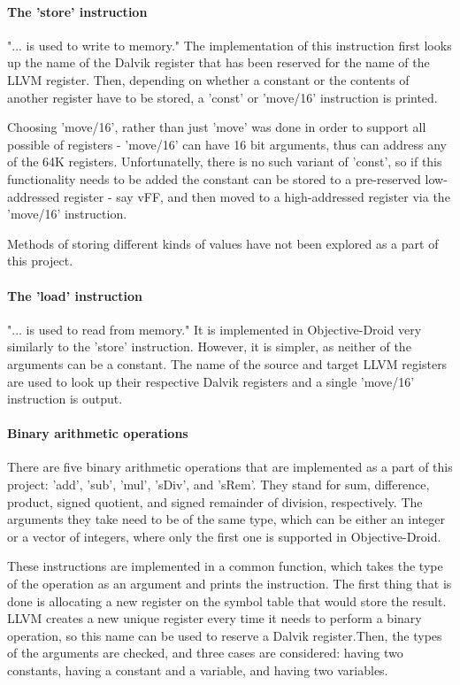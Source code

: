 \documentclass[parskip]{cs4rep}
\begin{document}
\paragraph{The 'store' instruction} "... is used to write to memory."\cite{P11} The implementation of this instruction first looks up the name of the Dalvik register that has been reserved for the name of the LLVM register. Then, depending on whether a constant or the contents of another register have to be stored, a 'const' or 'move/16' instruction is printed.

Choosing 'move/16', rather than just 'move' was done in order to support all possible of registers - 'move/16' can have 16 bit arguments, thus can address any of the 64K registers. Unfortunatelly, there is no such variant of 'const', so if this functionality needs to be added the constant can be stored to a pre-reserved low-addressed register - say vFF, and then moved to a high-addressed register via the 'move/16' instruction.

Methods of storing different kinds of values have not been explored as a part of this project.

\paragraph{The 'load' instruction} "... is used to read from memory."\cite{P11} It is implemented in Objective-Droid very similarly to the 'store' instruction. However, it is simpler, as neither of the arguments can be a constant. The name of the source and target LLVM registers are used to look up their respective Dalvik registers and a single 'move/16' instruction is output.

\paragraph{Binary arithmetic operations} There are five binary arithmetic operations that are implemented as a part of this project: 'add', 'sub', 'mul', 'sDiv', and 'sRem'. They stand for sum, difference, product, signed quotient, and signed remainder of division, respectively. The arguments they take need to be of the same type, which can be either an integer or a vector of integers, where only the first one is supported in Objective-Droid.

These instructions are implemented in a common function, which takes the type of the operation as an argument and prints the instruction. The first thing that is done is allocating a new register on the symbol table that would store the result. LLVM creates a new unique register every time it needs to perform a binary operation, so this name can be used to reserve a Dalvik register.Then, the types of the arguments are checked, and three cases are considered: having two constants, having a constant and a variable, and having two variables.
\end{document}
